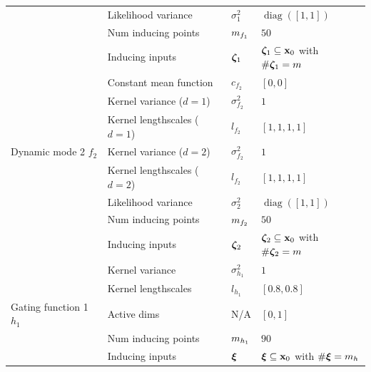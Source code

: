 \documentclass[twoside]{article}
\newcommand{\allData}[1]{\ensuremath{\MakeUppercase{#1}}}
\newcommand{\x}{\ensuremath{\mathbf{x}}}
\newcommand{\allInput}{\ensuremath{\allData{\x}}}
\newcommand{\diag}{\mathop{\mathrm{diag}}}
\begin{document}
\begin{table}[htbp]
\begin{tabular}{llll}
 & Likelihood variance & \(\sigma^{2}_{1}\) & \(\diag([1, 1])\)\\
 & Num inducing points & \(\relax{\ensuremath{m}}_{f_{1}}\) & \(50\)\\
 & Inducing inputs & \(\bm{\zeta}_1\) & \(\expertsInducingInput_1 \subseteq \allInput_{0}\) with \(\#\bm{\zeta}_1 = \relax{\ensuremath{m}}\)\\
\hline
 & Constant mean function & \(c_{f_{2}}\) & \([0,0]\)\\
 & Kernel variance (\(d=1\)) & \(\sigma^{2}_{f_{2}}\) & \(1\)\\
 & Kernel lengthscales  (\(d=1\)) & \(l_{f_{2}}\) & \([1, 1, 1,1]\)\\
Dynamic mode 2 \(f_{2}\) & Kernel variance (\(d=2\)) & \(\sigma^{2}_{f_{2}}\) & \(1\)\\
 & Kernel lengthscales (\(d=2\)) & \(l_{f_{2}}\) & \([1, 1, 1,1]\)\\
 & Likelihood variance & \(\sigma^{2}_{2}\) & \(\diag([1,1])\)\\
 & Num inducing points & \(\relax{\ensuremath{m}}_{f_{2}}\) & \(50\)\\
 & Inducing inputs & \(\bm{\zeta}_2\) & \(\expertsInducingInput_2 \subseteq \allInput_{0}\) with \(\#\bm{\zeta}_2 = \relax{\ensuremath{m}}\)\\
\hline
 & Kernel variance & \(\sigma^{2}_{h_{1}}\) & \(1\)\\
 & Kernel lengthscales & \(l_{h_{1}}\) & \([0.8, 0.8]\)\\
Gating function 1 \(h_{1}\) & Active dims & N/A & \([0, 1]\)\\
 & Num inducing points & \(\relax{\ensuremath{m}}_{h_{1}}\) & \(90\)\\
 & Inducing inputs & \(\bm{\xi}\) & \(\gatingInducingInput \subseteq \allInput_{0}\) with \(\#\bm{\xi} = \relax{\ensuremath{m}}_{h}\)\\
\end{tabular}
\end{table}

\newpage
\end{document}
